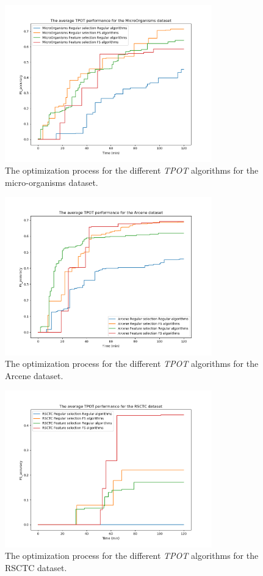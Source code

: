 \documentclass[10pt,a4paper]{report}
\begin{document}
	\begin{figure}[H]
		\centering
		\includegraphics[width=0.8\textwidth]{TPOT_avg_MO.PNG}
		\caption{The optimization process for the different \textit{TPOT} algorithms for the micro-organisms dataset.}
		\label{fig:TPOTResultMO}
	\end{figure}
	
	\begin{figure}[H]
		\centering
		\includegraphics[width=0.8\textwidth]{TPOT_avg_Arcene.PNG}
		\caption{The optimization process for the different \textit{TPOT} algorithms for the Arcene dataset.}
		\label{fig:TPOTResultArcene}
	\end{figure}
	
	\begin{figure}[H]
		\centering
		\includegraphics[width=0.8\textwidth]{TPOT_avg_RSCTC.PNG}
		\caption{The optimization process for the different \textit{TPOT} algorithms for the RSCTC dataset.}
		\label{fig:TPOTResultRSCTC}
	\end{figure}
	
\end{document}
